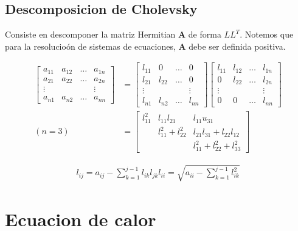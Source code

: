 \documentclass{article}
\theoremstyle{problemstyle}
\newcommand{\A}{\mathbf A}
\begin{document}
\subsection{Descomposicion de Cholevsky}
Consiste en descomponer la matriz Hermitian $ \A $ de forma $ LL^T $. Notemos que para la resolucio\'on de sistemas de ecuaciones, $ \A $ debe ser definida positiva.

  \begin{align*}
    \begin{bmatrix}
      a_{11} & a_{12} & \dots & a_{1n}\\
      a_{21} & a_{22} &\dots & a_{2n}\\
      \vdots & & &\vdots\\
      a_{n1} & a_{n2} & \dots & a_{nn}
    \end{bmatrix} &=
    \begin{bmatrix}
      l_{11} & 0 & \dots & 0\\
      l_{21} & l_{22} &\dots & 0\\
      \vdots & & &\vdots\\
      l_{n1} & l_{n2} & \dots & l_{nn}
    \end{bmatrix}  
    \begin{bmatrix}
      l_{11} & l_{12} & \dots & l_{1n}\\
      0 & l_{22}&\dots & l_{2n}\\
      \vdots & & &\vdots\\
      0 & 0 & \dots & l_{nn} 
    \end{bmatrix}  \\
    (n = 3)&=
    \begin{bmatrix}
      l^2_{11} & l_{11} l_{21} & l_{11}u_{31}\\
               &  l_{11}^2 + l_{22}^2& l_{21}l_{31} + l_{22}l_{12} \\
       & & l_{11}^2+l_{22}^2+l_{33}^2
    \end{bmatrix}
  \end{align*}

  \begin{align*}
    l_{ij} = a_{ij} - \sum_{k=1}^{j-1} l_{ik}l_{jk}
    l_{ii} = \sqrt{a_{ii} - \sum_{k=1}^{j-1}l_{ik}^2}
  \end{align*}

  \section{Ecuacion de calor}\label{sec:ecuacion_de_calor} %
\end{document}
